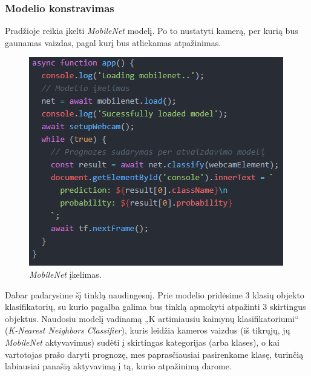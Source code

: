 \documentclass{VUMIFInfKursinis}
\begin{document}
\newpage

\subsubsection{Modelio konstravimas}

Pradžioje reikia įkelti \textit{MobileNet} modelį. Po to nustatyti kamerą, per kurią bus gaunamas vaizdas, pagal kurį bus atliekamas atpažinimas.

\begin{figure}[h!]
\centering
  \includegraphics[scale=0.9]{img/Prog1.PNG}
  \caption{\textit{MobileNet} įkelimas.}
  \label{fig:Prog1}
\end{figure}

\newpage

Dabar padarysime šį tinklą naudingesnį. Prie modelio pridėsime 3 klasių objekto klasifikatorių, su kurio pagalba galima bus tinklą apmokyti atpažinti 3 skirtingus objektus. Naudosiu modelį vadinamą „K artimiausiu kaimynų klasifikatoriumi“ (\textit{K-Nearest Neighbors Classifier}), kuris leidžia kameros vaizdus (iš tikrųjų, jų \textit{MobileNet} aktyvavimus) sudėti į skirtingas kategorijas (arba klases), o kai vartotojas prašo daryti prognozę, mes paprasčiausiai pasirenkame klasę, turinčią labiausiai panašią aktyvavimą į tą, kurio atpažinimą darome.
\end{document}
